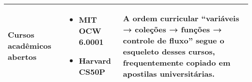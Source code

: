 \begin{table}[htbp]
\begin{tabular}{>{\raggedright}p{3.0cm} >{\raggedright}p{5.5cm} >{\raggedright\arraybackslash}p{6.5cm}}
Cursos acadêmicos abertos &
\begin{itemize}
  \item MIT OCW 6.0001
  \item Harvard CS50P
\end{itemize} &
A ordem curricular “variáveis → coleções → funções → controle de fluxo” segue o esqueleto desses cursos, frequentemente copiado em apostilas universitárias. \\ \bottomrule
\end{tabular}

\end{table}
